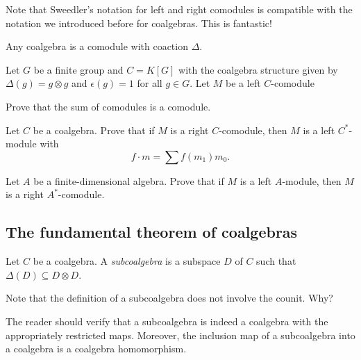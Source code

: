 \documentclass[12pt]{amsproc}
\begin{document}
Note that Sweedler's notation for left and right comodules is compatible with the notation we introduced before for coalgebras. This is fantastic!

\begin{example}
    Any coalgebra is a comodule with coaction $\Delta$. 
\end{example}


\begin{example}
    Let $G$ be a finite group and $C=K[G]$ with 
    the coalgebra structure given by $\Delta(g)=g\otimes g$ and 
    $\epsilon(g)=1$ for all $g\in G$. Let $M$ be a left $C$-comodule
\end{example}
    
\begin{exercise}
\label{xca:sum_comodules}
Prove that the sum of comodules is a comodule.     
\end{exercise}

\begin{exercise}
    \label{xca:1.6.4a}
    Let $C$ be a coalgebra. Prove that 
    if $M$ is a right $C$-comodule, then 
    $M$ is a left $C^*$-module with
    \[
    f\cdot m=\sum f(m_1)m_0.
    \]
\end{exercise}

\begin{exercise}
    \label{xca:1.6.4b}
    Let $A$ be a finite-dimensional algebra. Prove that 
    if $M$ is a left $A$-module, then 
    $M$ is a right $A^*$-comodule. 
\end{exercise}


\subsection{The fundamental theorem of coalgebras}

\begin{definition}
    Let $C$ be a coalgebra. A \emph{subcoalgebra} is
    a subspace $D$ of $C$ such that $\Delta(D)\subseteq D\otimes D$. 
\end{definition}

Note that the definition of a subcoalgebra does not involve the counit. Why?

The reader should verify that a subcoalgebra is indeed a coalgebra with the appropriately restricted maps. Moreover, the inclusion map of a subcoalgebra into a coalgebra is a coalgebra homomorphism.
\end{document}
